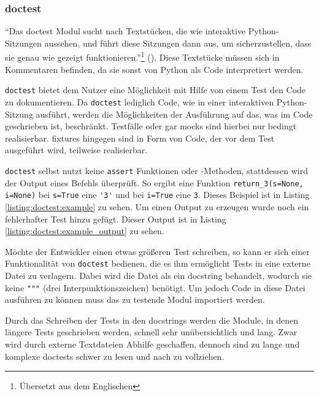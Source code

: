 \subsubsection{doctest}\label{python-tools:doctest}

"`Das doctest Modul sucht nach Textstücken, die wie interaktive Python-Sitzungen
aussehen, und führt diese Sitzungen dann aus, um sicherzustellen, dass sie genau
wie gezeigt funktionieren."'\footnote{Übersetzt aus dem Englischen}
(\cite{docs.python:doctest}). Diese Textstücke müssen sich in Kommentaren
befinden, da sie sonst von Python als Code interpretiert werden.

\lstinline{doctest} bietet dem Nutzer eine Möglichkeit mit Hilfe von einem Test
den Code zu dokumentieren. Da \lstinline{doctest} lediglich Code, wie in einer
interaktiven Python-Sitzung ausführt, werden die Möglichkeiten der Ausführung
auf das, was im Code geschrieben ist, beschränkt. Testfälle oder gar
\Glspl{mock} sind hierbei nur bedingt realisierbar. \Glspl{fixture} hingegen
sind in Form von Code, der vor dem Test ausgeführt wird, teilweise realisierbar.

\lstinline{doctest} selbst nutzt keine \lstinline{assert} Funktionen oder
-Methoden, stattdessen wird der Output eines Befehls überprüft. So ergibt eine
Funktion \lstinline{return_3(s=None, i=None)} bei \lstinline{s=True} eine
\lstinline{'3'} und bei \lstinline{i=True} eine \lstinline{3}. Dieses Beispiel 
ist in Listing \ref{listing:doctest:example} zu sehen. Um einen Output zu 
erzeugen wurde noch ein fehlerhafter Test hinzu gefügt. Dieser Output ist in 
Listing \ref{listing:doctest:example_output} zu sehen.

Möchte der Entwickler einen etwas größeren Test schreiben, so kann er sich einer
Funktionalität von \lstinline{doctest} bedienen, die es ihm ermöglicht Tests in
eine externe Datei zu verlagern. Dabei wird die Datei als ein \Gls{docstring}
behandelt, wodurch sie keine \lstinline{"""} (drei Interpunktionszeichen) 
benötigt. Um jedoch Code in diese Datei ausführen zu können muss das zu 
testende Modul importiert werden.

Durch das Schreiben der Tests in den \Glspl{docstring} werden die Module, in
denen längere Tests geschrieben werden, schnell sehr unübersichtlich und lang.
Zwar wird durch externe Textdateien Abhilfe geschaffen, dennoch sind zu lange 
und komplexe doctests schwer zu lesen und nach zu vollziehen.
\newline


